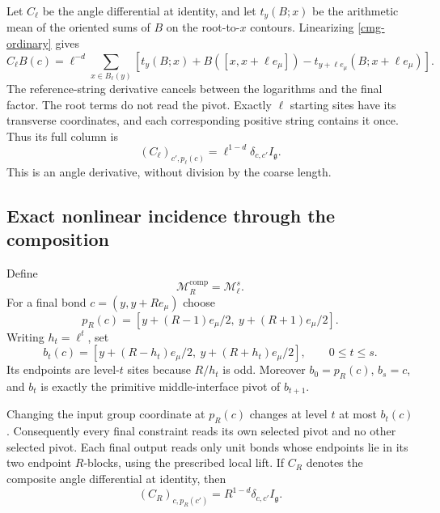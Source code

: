 Let $C_\ell$ be the angle differential at identity, and let
$t_y(B;x)$ be the arithmetic mean of the oriented sums of $B$ on
the root-to-$x$ contours. Linearizing \eqref{cmg-ordinary} gives
\begin{equation}
 C_\ell B(c)=\ell^{-d}\sum_{x\in B_\ell(y)}
 \left[t_y(B;x)+B([x,x+\ell e_\mu])
             -t_{y+\ell e_\mu}(B;x+\ell e_\mu)\right].
 \label{cmg-primitive-linear}
\end{equation}
The reference-string derivative cancels between the logarithms and
the final factor. The root terms do not read the pivot. Exactly $\ell$
starting sites have its transverse coordinates, and each corresponding
positive string contains it once. Thus its full column is
\begin{equation}
 (C_\ell)_{c',p_\ell(c)}
       =\ell^{1-d}\delta_{c,c'}I_{\mathfrak g}.
 \label{cmg-primitive-coefficient}
\end{equation}
This is an angle derivative, without division by the coarse length.

\subsection{Exact nonlinear incidence through the composition}
\label{cmg-composite-section}

Define
\begin{equation}
 \mathcal M_R^{\mathrm{comp}}=\mathcal M_\ell^s.
 \label{cmg-composite}
\end{equation}
For a final bond $c=(y,y+Re_\mu)$ choose
\begin{equation}
 p_R(c)=[y+(R-1)e_\mu/2,\ y+(R+1)e_\mu/2].
 \label{cmg-macro-pivot}
\end{equation}
Writing $h_t=\ell^t$, set
\begin{equation}
 b_t(c)=[y+(R-h_t)e_\mu/2,\ y+(R+h_t)e_\mu/2],
 \qquad 0\le t\le s.
 \label{cmg-pivot-chain}
\end{equation}
Its endpoints are level-$t$ sites because $R/h_t$ is odd.
Moreover $b_0=p_R(c)$, $b_s=c$, and $b_t$ is exactly the primitive
middle-interface pivot of $b_{t+1}$.

\begin{proposition}
\label{cmg-incidence-proposition}
Changing the input group coordinate at $p_R(c)$ changes at level $t$
at most $b_t(c)$. Consequently every final constraint reads its own
selected pivot and no other selected pivot. Each final output reads
only unit bonds whose endpoints lie in its two endpoint $R$-blocks,
using the prescribed local lift. If $C_R$ denotes the composite angle
differential at identity, then
\begin{equation}
 (C_R)_{c,p_R(c')}=R^{1-d}\delta_{c,c'}I_{\mathfrak g}.
 \label{cmg-composite-coefficient}
\end{equation}
\end{proposition}

